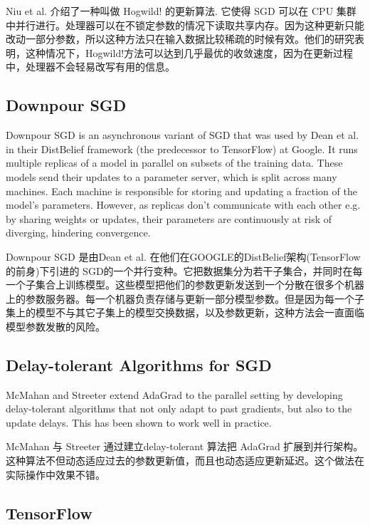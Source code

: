 \documentclass{article}
\begin{document}
Niu et al. \cite{Niu2011} 介绍了一种叫做 Hogwild! 的更新算法. 它使得 SGD 可以在 CPU 集群中并行进行。处理器可以在不锁定参数的情况下读取共享内存。因为这种更新只能改动一部分参数，所以这种方法只在输入数据比较稀疏的时候有效。他们的研究表明，这种情况下，Hogwild!方法可以达到几乎最优的收敛速度，因为在更新过程中，处理器不会轻易改写有用的信息。

\subsection{Downpour SGD}

Downpour SGD is an asynchronous variant of SGD that was used by Dean et al. \cite{Dean2012} in their DistBelief framework (the predecessor to TensorFlow) at Google. It runs multiple replicas of a model in parallel on subsets of the training data. These models send their updates to a parameter server, which is split across many machines. Each machine is responsible for storing and updating a fraction of the model's parameters. However, as replicas don't communicate with each other e.g. by sharing weights or updates, their parameters are continuously at risk of diverging, hindering convergence.

Downpour SGD 是由Dean et al. \cite{Dean2012}在他们在GOOGLE的DistBelief架构(TensorFlow 的前身)下引进的 SGD的一个并行变种。它把数据集分为若干子集合，并同时在每一个子集合上训练模型。这些模型把他们的参数更新发送到一个分散在很多个机器上的参数服务器。每一个机器负责存储与更新一部分模型参数。但是因为每一个子集上的模型不与其它子集上的模型交换数据，以及参数更新，这种方法会一直面临模型参数发散的风险。

\subsection{Delay-tolerant Algorithms for SGD}

McMahan and Streeter \cite{Mcmahan2014} extend AdaGrad to the parallel setting by developing delay-tolerant algorithms that not only adapt to past gradients, but also to the update delays. This has been shown to work well in practice.

McMahan 与 Streeter \cite{Mcmahan2014} 通过建立delay-tolerant 算法把 AdaGrad 扩展到并行架构。这种算法不但动态适应过去的参数更新值，而且也动态适应更新延迟。这个做法在实际操作中效果不错。

\subsection{TensorFlow}
\end{document}
